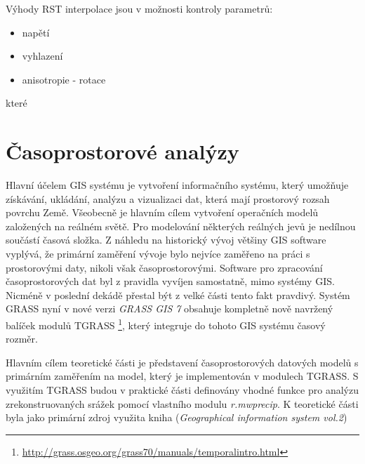 \documentclass[a4paper,12pt]{report}
\begin{document}
Výhody RST interpolace jsou v možnosti kontroly parametrů:

\begin{itemize}
\item napětí
\item vyhlazení
\item anisotropie - rotace
\end{itemize}

které 















\newpage
\setcounter{footnote}{1}
\section{Časoprostorové analýzy}
Hlavní účelem GIS systému je  vytvoření informačního systému, který umožňuje získávání, ukládání, analýzu a vizualizaci dat, která mají prostorový rozsah povrchu Země. Všeobecně je hlavním cílem vytvoření operačních modelů založených na reálném světě. Pro modelování některých reálných jevů je nedílnou součástí časová složka. Z náhledu na historický vývoj většiny GIS software vyplývá, že primární zaměření vývoje bylo nejvíce zaměřeno na práci s prostorovými daty, nikoli však časoprostorovými. Software pro zpracování  časoprostorových dat byl z pravidla vyvíjen samostatně, mimo systémy GIS. Nicméně v poslední dekádě přestal být z velké části tento fakt pravdivý.\cite{geospatialanal} Systém GRASS nyní v nové verzi \textit{GRASS GIS 7 } obsahuje kompletně nově navržený balíček modulů TGRASS \footnote{\url{http://grass.osgeo.org/grass70/manuals/temporalintro.html}}, který integruje do tohoto GIS systému časový rozměr.

Hlavním cílem teoretické části je představení časoprostorových datových modelů s primárním zaměřením na model, který je implementován v  modulech TGRASS. S využitím TGRASS budou v praktické části definovány vhodné funkce pro analýzu zrekonstruovaných srážek pomocí vlastního modulu \textit{r.mwprecip}. K teoretické části byla jako primární zdroj využita kniha (\textit{Geographical information system vol.2})\cite{gistemporal}
\end{document}
